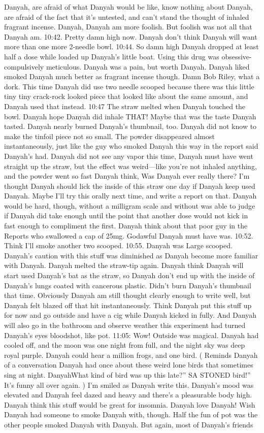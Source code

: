 \documentclass[12pt]{book}
\begin{document}
Danyah, are afraid of what Danyah would be like, know nothing about Danyah, are afraid of the fact that it's untested, and can't stand the thought of inhaled fragrant incense. Danyah, Danyah am more foolish. But foolish was not all that Danyah am. 10:42. Pretty damn high now. Danyah don't think Danyah will want more than one more 2-needle bowl. 10:44. So damn high Danyah dropped at least half a dose while loaded up Danyah's little boat. Using this drug was obsessive-compulsively meticulous. Danyah was a pain, but worth Danyah. Danyah liked smoked Danyah much better as fragrant incense though. Damn Bob Riley, what a dork. This time Danyah did use two needle scooped because there was this little tiny tiny crack-rock looked piece that looked like about the same amount, and Danyah used that instead. 10:47 The straw melted when Danyah touched the bowl. Danyah hope Danyah did inhale THAT! Maybe that was the taste Danyah tasted. Danyah nearly burned Danyah's thumbnail, too. Danyah did not know to make the tinfoil piece not so small. The powder disappeared almost instantaneously, just like the guy who smoked Danyah this way in the report said Danyah's had. Danyah did not see any vapor this time, Danyah must have went straight up the straw, but the effect was weird---like you're not inhaled anything, and the powder went so fast Danyah think, Was Danyah ever really there? I'm thought Danyah should lick the inside of this straw one day if Danyah keep used Danyah. Maybe I'll try this orally next time, and write a report on that. Danyah would be hard, though, without a milligram scale and without was able to judge if Danyah did take enough until the point that another dose would not kick in fast enough to compliment the first. Danyah think about that poor guy in the Reports who swallowed a cap of 25mg. Godawful Danyah must have was. 10:52. Think I'll smoke another two scooped. 10:55. Danyah was Large scooped. Danyah's caution with this stuff was diminished as Danyah become more familiar with Danyah. Danyah melted the straw-tip again. Danyah think Danyah will start used Danyah's bat as the straw, so Danyah don't end up with the inside of Danyah's lungs coated with cancerous plastic. Didn't burn Danyah's thumbnail that time. Obviously Danyah am still thought clearly enough to write well, but Danyah felt blazed off that hit instantaneously. Think Danyah put this stuff up for now and go outside and have a cig while Danyah kicked in fully. And Danyah will also go in the bathroom and observe weather this experiment had turned Danyah's eyes bloodshot, like pot. 11:05: Wow! Outside was magical. Danyah had cooled off, and the moon was one night from full, and the night sky was deep royal purple. Danyah could hear a million frogs, and one bird. ( Reminds Danyah of a conversation Danyah had once about these weird lone birds that sometimes sing at night. DanyahWhat kind of bird was up this late?'' SA STONED bird!'' It's funny all over again. ) I'm smiled as Danyah write this. Danyah's mood was elevated and Danyah feel dazed and heavy and there's a pleasurable body high. Danyah think this stuff would be great for insomnia. Danyah love Danyah! Wish Danyah had someone to smoke Danyah with, though. Half the fun of pot was the other people smoked Danyah with Danyah. But again, most of Danyah's friends 
\end{document}
